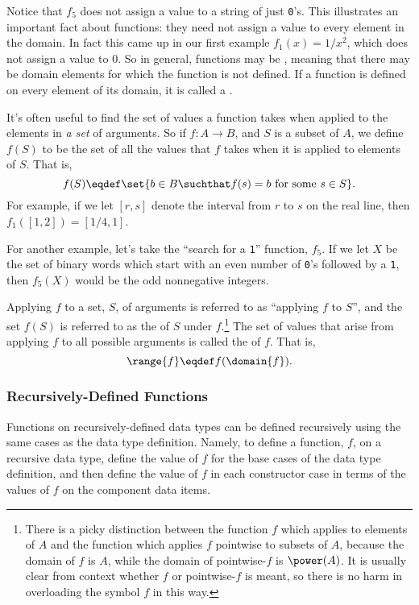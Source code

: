 Notice that $f_5$ does not assign a value to a string of just \texttt{0}'s.
This illustrates an important fact about functions: they need not assign a
value to every element in the domain.  In fact this came up in our first
example $f_1(x)=1/x^2$, which does not assign a value to $0$.  So in
general, functions may be , meaning that there may be domain
elements for which the function is not defined.  If a function is defined
on every element of its domain, it is called a .

It's often useful to find the set of values a function takes when applied
to the elements in \emph{a set} of arguments.  So if $f:A \to B$, and $S$
is a subset of $A$, we define $f(S)$ to be the set of all the values that
$f$ takes when it is applied to elements of $S$.  That is,
\[
f(S) \eqdef \set{b \in B \suchthat f(s) = b \text{ for some } s
  \in S}.
\]
For example, if we let $[r,s]$ denote the interval from $r$ to $s$ on the
real line, then $f_1([1,2]) = [1/4,1]$.

For another example, let's take the ``search for a \texttt{1}''
function, $f_5$.  If we let $X$ be the set of binary words which
start with an even number of \texttt{0}'s followed by a
\texttt{1}, then $f_5(X)$ would be the odd nonnegative integers.

Applying $f$ to a set, $S$, of arguments is referred to as
``applying $f$  to $S$'', and the
set $f(S)$ is referred to as the  of $S$ under
$f$.\footnote{There is a picky distinction between the function $f$ which
  applies to elements of $A$ and the function which applies $f$ pointwise
  to subsets of $A$, because the domain of $f$ is $A$, while the domain of
  pointwise-$f$ is $\power(A)$.  It is usually clear from context whether
  $f$ or pointwise-$f$ is meant, so there is no harm in overloading the
  symbol $f$ in this way.}  The set of values that arise from applying $f$
to all possible arguments is called the  of $f$.  That is,
\[
\range{f} \eqdef f(\domain{f}).
\]

\subsubsection{Recursively-Defined Functions}

Functions on recursively-defined data types can be defined recursively
using the same cases as the data type definition.  Namely, to define a
function, $f$, on a recursive data type, define the value of $f$ for the
base cases of the data type definition, and then define the value of $f$
in each constructor case in terms of the values of $f$ on the component
data items.

